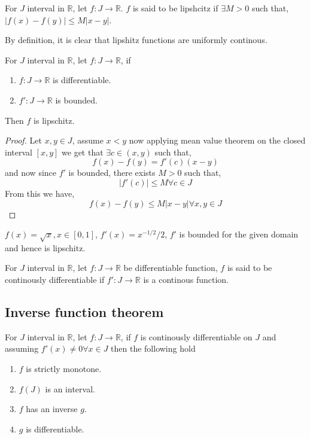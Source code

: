 \documentclass[11pt,a4paper]{colorart}
\def\R{\mathbb{R}}
\def\ra{\rightarrow}
\begin{document}
\begin{definition}
	For $J$ interval in $\R$, let $f:J\ra\R$. $f$ is said to be lipshcitz if $\exists M>0$ such that, $|f(x)-f(y)|\leq M|x-y|$.
\end{definition}

By definition, it is clear that lipshitz functions are uniformly continous.

\begin{theorem}
	For $J$ interval in $\R$, let $f:J\ra\R$, if 
	\begin{enumerate}
		\item $f:J\ra\R$ is differentiable.
		\item $f':J\ra\R$ is bounded.
	\end{enumerate}
	Then $f$ is lipschitz.
\end{theorem}

\begin{proof}
	Let $x,y\in J$, assume $x<y$ now applying mean value theorem on the closed interval $[x,y]$ we get that $\exists c \in (x,y)$ such that,
	\[ f(x) - f(y) = f'(c)(x-y) \]
	and now since $f'$ is bounded, there exists $M>0$ such that,
	\[ |f'(c)| \leq M \forall c \in J \]
	From this we have,
	\[ f(x) - f(y) \leq M|x-y| \forall x,y \in J \]
\end{proof}

\begin{example}
	$f(x) = \sqrt{x}, x \in [0,1]$, $f'(x) = x^{-1/2}/2$, $f'$ is bounded for the given domain and hence is lipschitz.
\end{example}

\begin{definition}
	For $J$ interval in $\R$, let $f:J\ra\R$ be differentiable function, $f$ is said to be continously differentiable if $f':J \ra \R$ is a continous function.
\end{definition}

\subsection{Inverse function theorem}

\begin{theorem}
	For $J$ interval in $\R$, let $f:J\ra\R$, if $f$ is continously differentiable on $J$ and assuming $f'(x) \neq 0 \forall x \in J$ then the following hold
	\begin{enumerate}
		\item $f$ is strictly monotone.
		\item $f(J)$ is an interval.
		\item $f$ has an inverse $g$.
		\item $g$ is differentiable.
	\end{enumerate}
\end{theorem}
\end{document}
